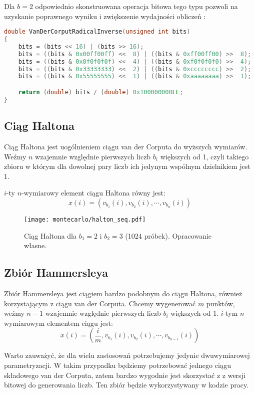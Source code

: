 \documentclass[../main.tex]{subfiles}
\begin{document}
Dla $b=2$ odpowiednio skonstruowana operacja bitowa tego typu pozwoli na uzyskanie poprawnego wyniku i zwiększenie wydajności obliczeń \cite{dammertz_2012,MultidimensionalSampling}:

\begin{lstlisting}[language=c++]
double VanDerCorputRadicalInverse(unsigned int bits)
{
	bits = (bits << 16) | (bits >> 16);
	bits = ((bits & 0x00ff00ff) <<  8) | ((bits & 0xff00ff00) >>  8);
	bits = ((bits & 0x0f0f0f0f) <<  4) | ((bits & 0xf0f0f0f0) >>  4);
	bits = ((bits & 0x33333333) <<  2) | ((bits & 0xcccccccc) >>  2);
	bits = ((bits & 0x55555555) <<  1) | ((bits & 0xaaaaaaaa) >>  1);

	return (double) bits / (double) 0x100000000LL;
}
\end{lstlisting}

\subsection{Ciąg Haltona}

Ciąg Haltona jest uogólnieniem ciągu van der Corputa do wyższych wymiarów. Weźmy $n$ wzajemnie względnie pierwszych liczb $b_i$ większych od 1, czyli takiego zbioru w którym dla dowolnej pary liczb ich jedynym wspólnym dzielnikiem jest 1.

$i$-ty $n$-wymiarowy element ciągu Haltona równy jest:
\[ 
x(i) = \left( v_{b_1}(i), v_{b_2}(i), \cdots, v_{b_n}(i) \right) 
\]

\begin{figure}[h]
  \centering
  \texttt{[image: montecarlo/halton\_seq.pdf]}
  \caption{Ciąg Haltona dla $b_1=2$ i $b_2=3$ (1024 próbek). Opracowanie własne.}
  \label{fig:HaltonSamples}
\end{figure}

\subsection{Zbiór Hammersleya}

Zbiór Hammersleya jest ciągiem bardzo podobnym do ciągu Haltona, również korzystającym z ciągu van der Corputa. Chcemy wygenerować $m$ punktów, weźmy $n-1$ wzajemnie względnie pierwszych liczb $b_i$ większych od 1. $i$-tym $n$ wymiarowym elementem ciągu jest:
\[
  x(i) = \left(
    \frac{i}{m}, v_{b_1}(i), v_{b_2}(i), \cdots, v_{b_{n-1}}(i)
  \right)
\]

Warto zauważyć, że dla wielu zastosowań potrzebujemy jedynie dwuwymiarowej parametryzacji. W takim przypadku będziemy potrzebować jednego ciągu składowego van der Corputa, zatem bardzo wygodnie jest skorzystać z  z wersji bitowej do generowania liczb. Ten zbiór będzie wykorzystywany w kodzie pracy.
\end{document}
